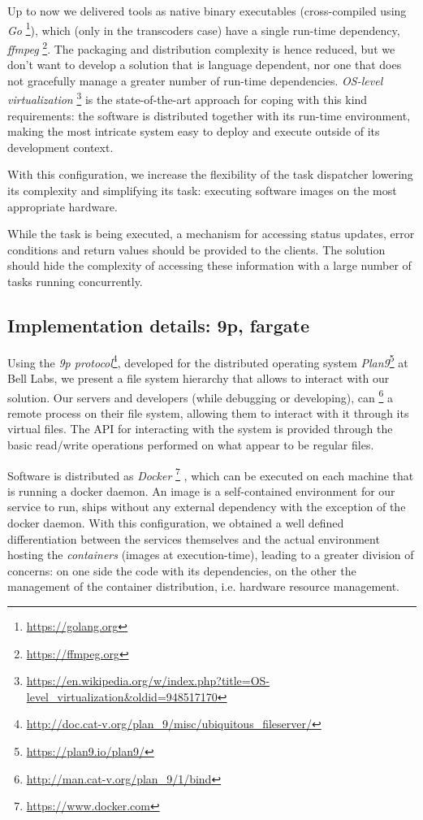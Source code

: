 \documentclass{article}
\begin{document}
Up to now we delivered tools as native binary executables (cross-compiled using \textit{Go} \footnote{\url{https://golang.org}}), which (only in the transcoders case) have a single run-time dependency, \textit{ffmpeg} \footnote{\url{https://ffmpeg.org}}. The packaging and distribution complexity is hence reduced, but we don't want to develop a solution that is language dependent, nor one that does not gracefully manage a greater number of run-time dependencies. \textit{OS-level virtualization} \footnote{\url{https://en.wikipedia.org/w/index.php?title=OS-level_virtualization\&oldid=948517170}} is the state-of-the-art approach for coping with this kind requirements: the software is distributed together with its run-time environment, making the most intricate system easy to deploy and execute outside of its development context.

With this configuration, we increase the flexibility of the task dispatcher lowering its complexity and simplifying its task: executing software images on the most appropriate hardware.

While the task is being executed, a mechanism for accessing status updates, error conditions and return values should be provided to the clients. The solution should hide the complexity of accessing these information with a large number of tasks running concurrently.

\subsection{Implementation details: 9p, fargate}
Using the \textit{9p protocol}\footnote{\url{http://doc.cat-v.org/plan_9/misc/ubiquitous_fileserver/}}, developed for the distributed operating system \textit{Plan9}\footnote{\url{https://plan9.io/plan9/}} at Bell Labs, we present a file system hierarchy that allows to interact with our solution. Our servers and developers (while debugging or developing), can \footnote{\url{http://man.cat-v.org/plan_9/1/bind}} a remote process on their file system, allowing them to interact with it through its virtual files. The API for interacting with the system is provided through the basic read/write operations performed on what appear to be regular files.

Software is distributed as \textit{Docker} \footnote{\url{https://www.docker.com}} , which can be executed on each machine that is running a docker daemon. An image is a self-contained environment for our service to run, ships without any external dependency with the exception of the docker daemon. With this configuration, we obtained a well defined differentiation between the services themselves and the actual environment hosting the \textit{containers} (images at execution-time), leading to a greater division of concerns: on one side the code with its dependencies, on the other the management of the container distribution, i.e. hardware resource management.
\end{document}
